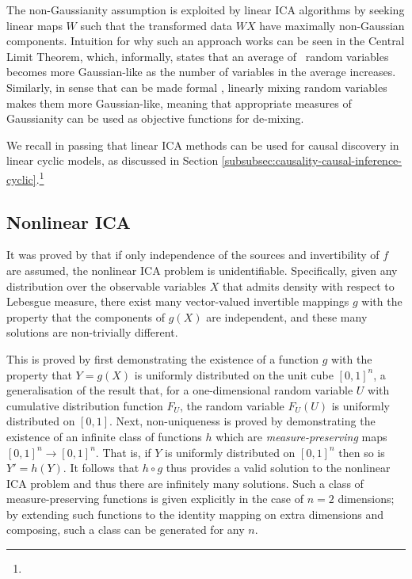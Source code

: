 The non-Gaussianity assumption is exploited by linear ICA algorithms by seeking linear maps $W$ such that the transformed data ${W}X$ have maximally non-Gaussian components.
Intuition for why such an approach works can be seen in the Central Limit Theorem, which, informally, states that an average of \iid~random variables becomes more Gaussian-like as the number of variables in the average increases. 
Similarly, in sense that can be made formal \citep{hyvarinen2000independent}, linearly mixing random variables makes them more Gaussian-like, meaning that appropriate measures of Gaussianity can be used as objective functions for de-mixing.

We recall in passing that linear ICA methods can be used for causal discovery in linear cyclic models, as discussed in Section \ref{subsubsec:causality-causal-inference-cyclic}.\footnote{}





\subsection{Nonlinear ICA}\label{subsec:ica-literature-nonlinear-ica}
 
It was proved by \cite{hyvarinen1999nonlinear} that if only independence of the sources and invertibility of $f$ are assumed, the nonlinear ICA problem is unidentifiable.
Specifically, given any distribution over the observable variables $X$ that admits density with respect to Lebesgue measure, there exist many vector-valued invertible mappings $g$ with the property that the components of $g(X)$ are independent, and these many solutions are non-trivially different.

This is proved by first demonstrating the existence of a function $g$ with the property that $Y=g(X)$ is uniformly distributed on the unit cube $[0, 1]^n$,
a generalisation of the result that, for a one-dimensional random variable $U$  with cumulative distribution function $F_U$, the random variable $F_U(U)$ is uniformly distributed on $[0,1]$.
Next, non-uniqueness is proved by demonstrating the existence of an infinite class of functions $h$ which are \emph{measure-preserving} maps $[0,1]^n \to [0,1]^n$. 
That is, if $Y$ is uniformly distributed on $[0,1]^n$ then so is  $Y' = {h}({Y})$.
It follows that ${h}\circ {g}$ thus provides a valid solution to the nonlinear ICA problem and thus there are infinitely many solutions. 
Such a class of measure-preserving functions is given explicitly in the case of $n=2$ dimensions; by extending such functions to the identity mapping on extra dimensions and composing, such a class can be generated for any $n$.

